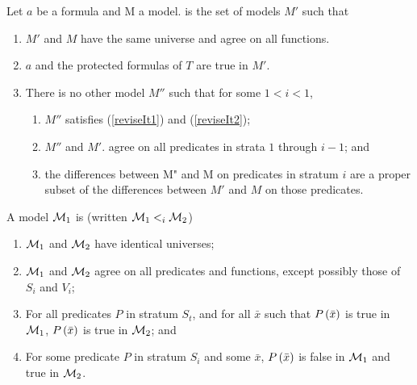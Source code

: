 \begin{defi}
Let $a$ be a formula and M a model.  is the set of models $M'$ such that
\begin{enumerate}
\item \label{reviseIt1} $M'$ and $M$ have the same universe and agree on all functions.
\item \label{reviseIt2} $a$ and the protected formulas of $T$ are true in $M'$.
\item There is no other model $M''$ such that for some $1<i<1$,
\begin{enumerate}
\item $M''$ satisfies (\ref{reviseIt1}) and (\ref{reviseIt2});
\item $M''$ and $M'$. agree on all predicates in strata $1$ through $i-1$; and
\item the differences between M" and M on predicates in stratum $i$ are a proper subset of the differences between $M'$ and $M$ on those predicates.
\end{enumerate}
\end{enumerate}
\cite{conf/ijcai/Winslett89}
\end{defi}

\begin{defi}
A model $\mathcal{M}_1$ is  (written $\mathcal{M}_1<_i\mathcal{M}_2$) \iffTx{}
\begin{enumerate}
\item $\mathcal{M}_1$ and $\mathcal{M}_2$ have identical universes;
\item $\mathcal{M}_1$ and $\mathcal{M}_2$ agree on all predicates and functions, except possibly those of $S_i$ and $V_i$;
\item For all predicates $P$ in stratum $S_t$, and for all $\bar{x}$ such that $P\left(\bar{x}\right)$ is true in $\mathcal{M}_1$, $P\left(\bar{x}\right)$ is true in $\mathcal{M}_2$; and
\item For some predicate $P$ in stratum $S_i$ and some $\bar{x}$, $P\left(\bar{x}\right)$ is false in $\mathcal{M}_1$ and true in $\mathcal{M}_2$.
\end{enumerate}
\cite{conf/ijcai/Winslett89}
\end{defi}

